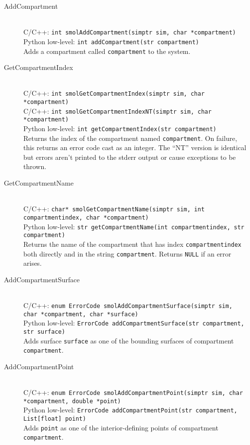 \documentclass {book}
\newcommand {\ttt} {\texttt}
\begin{document}
\begin{description}

\item[AddCompartment]
\hfill \\
C/C++: \ttt{int smolAddCompartment(simptr sim, char *compartment)}\\
Python low-level: \ttt{int addCompartment(str compartment)}\\
Adds a compartment called \ttt{compartment} to the system.

\item[GetCompartmentIndex]
\hfill \\
C/C++: \ttt{int smolGetCompartmentIndex(simptr sim, char *compartment)}\\
C/C++: \ttt{int smolGetCompartmentIndexNT(simptr sim, char *compartment)}\\
Python low-level: \ttt{int getCompartmentIndex(str compartment)}\\
Returns the index of the compartment named \ttt{compartment}. On failure, this returns an error code cast as an integer. The ``NT'' version is identical but errors aren't printed to the stderr output or cause exceptions to be thrown.

\item[GetCompartmentName]
\hfill \\
C/C++: \ttt{char* smolGetCompartmentName(simptr sim, int compartmentindex, char *compartment)}\\
Python low-level: \ttt{str getCompartmentName(int compartmentindex, str compartment)}\\
Returns the name of the compartment that has index \ttt{compartmentindex} both directly and in the string \ttt{compartment}. Returns \ttt{NULL} if an error arises.

\item[AddCompartmentSurface]
\hfill \\
C/C++: \ttt{enum ErrorCode smolAddCompartmentSurface(simptr sim, char *compartment, char *surface)}\\
Python low-level: \ttt{ErrorCode addCompartmentSurface(str compartment, str surface)}\\
Adds surface \ttt{surface} as one of the bounding surfaces of compartment \ttt{compartment}.

\item[AddCompartmentPoint]
\hfill \\
C/C++: \ttt{enum ErrorCode smolAddCompartmentPoint(simptr sim, char *compartment, double *point)}\\
Python low-level: \ttt{ErrorCode addCompartmentPoint(str compartment, List[float] point)}\\
Adds \ttt{point} as one of the interior-defining points of compartment \ttt{compartment}.


\end{description}
\end{document}
